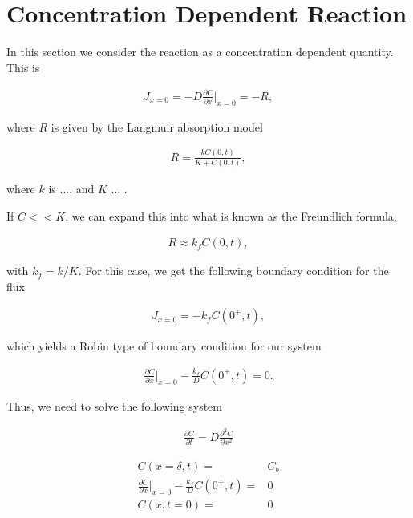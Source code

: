 \section{Concentration Dependent Reaction}
	
	In this section we consider the reaction as a concentration dependent quantity. This is
	
	
	\begin{align}
		J_{x=0} = -D\frac{\partial C}{\partial x}\big|_{x=0} = -R,
	\end{align}
	
	where $R$ is given by the Langmuir absorption model
	
	\begin{align}
		R = \frac{k C(0, t)}{K + C(0, t)},
	\end{align} 
	
	where $k$ is  ....  and $K$ ... .
	
	If $C << K$, we can expand this into what is known as the Freundlich formula,
	
	\begin{align}
		R \approx k_f C(0, t),
	\end{align} 
	
	with $k_f = k/K$. For this case, we get the following boundary condition for the flux
	
	\begin{align}
		J_{x=0} = -k_fC(0^+,t),
	\end{align}
	
	which yields a Robin type of boundary condition for our system
	
	\begin{align}
		 \frac{\partial C}{\partial x}\big|_{x=0} -\frac{k_f}{D}C(0^+,t) = 0.
	\end{align}
	
	Thus, we need to solve the following system
	
		
	\begin{align}
		\frac{\partial C}{\partial t} = D \frac{\partial^2 C}{\partial x^2}
		\label{eq:dynamic-system}
	\end{align}
	
	\begin{align}
		C(x = \delta, t) =& C_b\\
		\frac{\partial C}{\partial x}\big|_{x=0} -\frac{k_f}{D}C(0^+,t) =& 0\\
		C(x, t=0) =& 0
		\label{eq:border-conditions-dynamic}
	\end{align}





